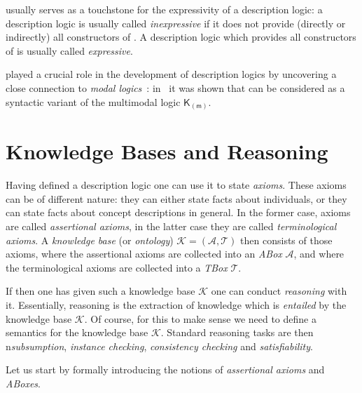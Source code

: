 \ALC usually serves as a touchstone for the expressivity of a description logic: a
description logic is usually called \emph{inexpressive} if it does not provide (directly
or indirectly) all constructors of \ALC.  A description logic which provides all
constructors of \ALC is usually called \emph{expressive}.

\ALC played a crucial role in the development of description logics by uncovering a close
connection to \emph{modal logics}~\cite{MLhandbook,BaaderLutz-MLhandbook-06}:
in~\cite{DBLP:conf/ijcai/Schild91} it was shown that \ALC can be considered as a syntactic
variant of the multimodal logic $\mathsf{K}_{(\mathsf{m})}$.

\section{Knowledge Bases and Reasoning}
\label{sec:knowledge-bases}

Having defined a description logic one can use it to state \emph{axioms}.  These axioms
can be of different nature: they can either state facts about individuals, or they can
state facts about concept descriptions in general.  In the former case, axioms are called
\emph{assertional axioms}, in the latter case they are called \emph{terminological
  axioms}.  A \emph{knowledge base} (or \emph{ontology}) $\mathcal{K} = (\mathcal{A},
\mathcal{T})$ then consists of those axioms, where the assertional axioms are collected
into an \emph{ABox} $\mathcal{A}$, and where the terminological axioms are collected into
a \emph{TBox} $\mathcal{T}$.

If then one has given such a knowledge base $\mathcal{K}$ one can conduct \emph{reasoning}
with it.  Essentially, reasoning is the extraction of knowledge which is \emph{entailed}
by the knowledge base $\mathcal{K}$.  Of course, for this to make sense we need to define
a semantics for the knowledge base $\mathcal{K}$.  Standard reasoning tasks are then
n\emph{subsumption}, \emph{instance checking}, \emph{consistency checking} and
\emph{satisfiability}.

Let us start by formally introducing the notions of \emph{assertional axioms} and
\emph{ABoxes}.

